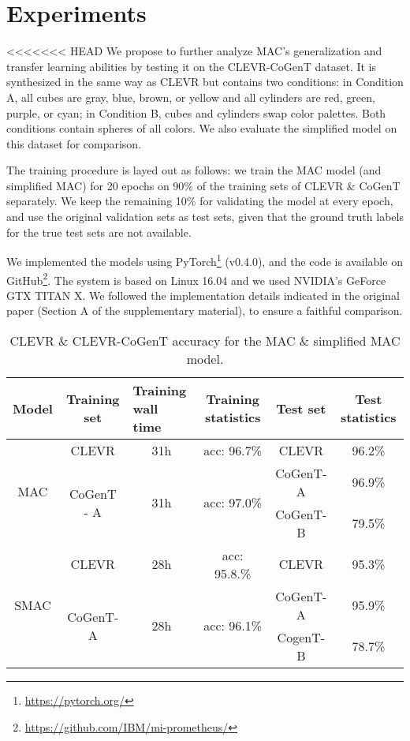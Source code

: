 \section{Experiments}

<<<<<<< HEAD
We propose to further analyze MAC's generalization and transfer learning abilities by testing it on the CLEVR-CoGenT dataset. It is synthesized in the same way as CLEVR but contains two conditions: in Condition A, all cubes are gray, blue, brown, or yellow and all cylinders are red, green, purple, or cyan; in Condition B, cubes and cylinders swap color palettes. Both conditions contain spheres of all colors. We also evaluate the simplified model on this dataset for comparison.

The training procedure is layed out as follows: we train the MAC model (and simplified MAC) for 20 epochs on 90\% of the training sets of CLEVR \& CoGenT separately. We keep the remaining 10\% for validating the model at every epoch, and use the original validation sets as test sets, given that the ground truth labels for the true test sets are not available.

We implemented the models using PyTorch\footnote{\url{https://pytorch.org/}} (v0.4.0), and the code is available on GitHub\footnote{\url{https://github.com/IBM/mi-prometheus/}}. The system is based on Linux 16.04 and we used NVIDIA's GeForce GTX TITAN X. We followed the implementation details indicated in the original paper (Section A of the supplementary material), to ensure a faithful comparison.

\begin{table}[]
	\centering
	\begin{tabular}{|c|c|c|c|c|c|}
		\hline
		Model                 & Training set                & \multicolumn{1}{l|}{Training wall time} & Training statistics          & Test set & Test statistics \\ \hline
		\multirow{3}{*}{MAC}  & CLEVR                       & 31h                                     & acc: 96.7\%                  & CLEVR    & 96.2\%          \\ \cline{2-6} 
		& \multirow{2}{*}{CoGenT - A} & \multirow{2}{*}{31h}                    & \multirow{2}{*}{acc: 97.0\%} & CoGenT-A & 96.9\%          \\ \cline{5-6} 
		&                             &                                         &                              & CoGenT-B & 79.5\%          \\ \hline
		\multirow{3}{*}{SMAC} & CLEVR                       & 28h                                     & acc: 95.8.\%                 & CLEVR    & 95.3\%          \\ \cline{2-6} 
		& \multirow{2}{*}{CoGenT-A}   & \multirow{2}{*}{28h}                    & \multirow{2}{*}{acc: 96.1\%} & CoGenT-A & 95.9\%          \\ \cline{5-6} 
		&                             &                                         &                              & CogenT-B & 78.7\%          \\ \hline
	\end{tabular}
	\caption{CLEVR \& CLEVR-CoGenT accuracy for the MAC \& simplified MAC model.}
	\label{results}
\end{table}

